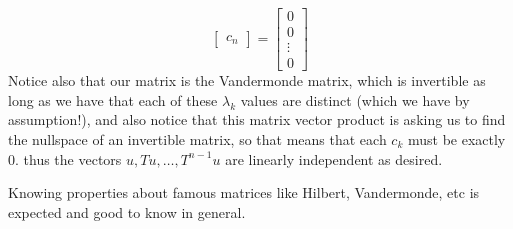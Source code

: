 \documentclass[answers]{exam}
\begin{document}
\begin{questions}
\begin{parts}
\begin{solution}
\[\begin{bmatrix}
                    c_n
                \end{bmatrix} = \begin{bmatrix}
                    0\\
                    0\\
                    \vdots\\
                    0
                \end{bmatrix}
            \]
            Notice also that our matrix is the Vandermonde matrix, which is invertible as long as we have that
            each of these $\lambda_k$ values are distinct (which we have by assumption!), and also notice that 
            this matrix vector product is asking us to find the nullspace of an invertible matrix, so that means
            that each $c_k$ must be exactly $0$. thus the vectors $u,Tu,\dots,T^{n-1}u$ are linearly independent
            as desired. 

             Knowing properties about famous matrices like Hilbert, Vandermonde, etc is expected
            and good to know in general.


\end{solution}
\end{parts}
\end{questions}
\end{document}
